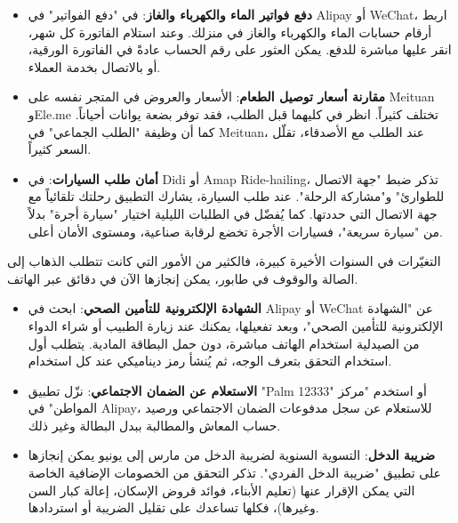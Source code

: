 
\begin{itemize}
  \item \textbf{دفع فواتير الماء والكهرباء والغاز}: في "دفع الفواتير" في Alipay أو WeChat، اربط أرقام حسابات الماء والكهرباء والغاز في منزلك. وعند استلام الفاتورة كل شهر، انقر عليها مباشرة للدفع. يمكن العثور على رقم الحساب عادةً في الفاتورة الورقية، أو بالاتصال بخدمة العملاء.
  \item \textbf{مقارنة أسعار توصيل الطعام}: الأسعار والعروض في المتجر نفسه على Meituan وEle.me تختلف كثيراً. انظر في كليهما قبل الطلب، فقد توفر بضعة يوانات أحياناً. كما أن وظيفة "الطلب الجماعي" في Meituan، عند الطلب مع الأصدقاء، تقلّل السعر كثيراً.
  \item \textbf{أمان طلب السيارات}: في Didi أو Amap Ride-hailing، تذكر ضبط "جهة الاتصال للطوارئ" و"مشاركة الرحلة". عند طلب السيارة، يشارك التطبيق رحلتك تلقائياً مع جهة الاتصال التي حددتها. كما يُفضّل في الطلبات الليلية اختيار "سيارة أجرة" بدلاً من "سيارة سريعة"، فسيارات الأجرة تخضع لرقابة صناعية، ومستوى الأمان أعلى.
\end{itemize}


التغيّرات في السنوات الأخيرة كبيرة، فالكثير من الأمور التي كانت تتطلب الذهاب إلى الصالة والوقوف في طابور، يمكن إنجازها الآن في دقائق عبر الهاتف.

\begin{itemize}
  \item \textbf{الشهادة الإلكترونية للتأمين الصحي}: ابحث في Alipay أو WeChat عن "الشهادة الإلكترونية للتأمين الصحي"، وبعد تفعيلها، يمكنك عند زيارة الطبيب أو شراء الدواء من الصيدلية استخدام الهاتف مباشرة، دون حمل البطاقة المادية. يتطلب أول استخدام التحقق بتعرف الوجه، ثم يُنشأ رمز ديناميكي عند كل استخدام.
  \item \textbf{الاستعلام عن الضمان الاجتماعي}: نزّل تطبيق "Palm 12333" أو استخدم "مركز المواطن" في Alipay، للاستعلام عن سجل مدفوعات الضمان الاجتماعي ورصيد حساب المعاش والمطالبة ببدل البطالة وغير ذلك.
  \item \textbf{ضريبة الدخل}: التسوية السنوية لضريبة الدخل من مارس إلى يونيو يمكن إنجازها على تطبيق "ضريبة الدخل الفردي". تذكر التحقق من الخصومات الإضافية الخاصة التي يمكن الإقرار عنها (تعليم الأبناء، فوائد قروض الإسكان، إعالة كبار السن وغيرها)، فكلها تساعدك على تقليل الضريبة أو استردادها.
\end{itemize}


